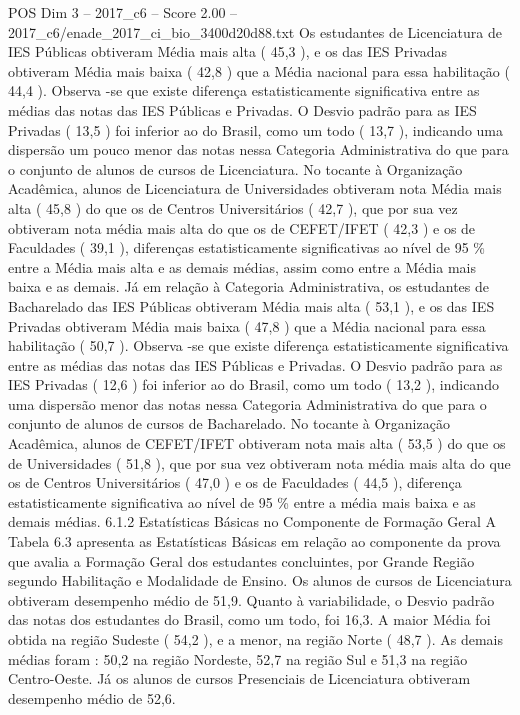 \begin{textsample}{POS Dim 3 – 2017\_c6 – Score 2.00 – 2017\_c6/enade\_2017\_ci\_bio\_3400d20d88.txt}
Os estudantes de Licenciatura de IES Públicas obtiveram Média mais alta ( 45,3 ), e os das IES Privadas obtiveram Média mais baixa ( 42,8 ) que a Média nacional para essa habilitação ( 44,4 ).
Observa -se que existe diferença estatisticamente significativa entre as médias das notas das IES Públicas e Privadas.
O Desvio padrão para as IES Privadas ( 13,5 ) foi inferior ao do Brasil, como um todo ( 13,7 ), indicando uma dispersão um pouco menor das notas nessa Categoria Administrativa do que para o conjunto de alunos de cursos de Licenciatura.
No tocante à Organização Acadêmica, alunos de Licenciatura de Universidades obtiveram nota Média mais alta ( 45,8 ) do que os de Centros Universitários ( 42,7 ), que por sua vez obtiveram nota média mais alta do que os de CEFET/IFET ( 42,3 ) e os de Faculdades ( 39,1 ), diferenças estatisticamente significativas ao nível de 95 \% entre a Média mais alta e as demais médias, assim como entre a Média mais baixa e as demais.
Já em relação à Categoria Administrativa, os estudantes de Bacharelado das IES Públicas obtiveram Média mais alta ( 53,1 ), e os das IES Privadas obtiveram Média mais baixa ( 47,8 ) que a Média nacional para essa habilitação ( 50,7 ).
Observa -se que existe diferença estatisticamente significativa entre as médias das notas das IES Públicas e Privadas.
O Desvio padrão para as IES Privadas ( 12,6 ) foi inferior ao do Brasil, como um todo ( 13,2 ), indicando uma dispersão menor das notas nessa Categoria Administrativa do que para o conjunto de alunos de cursos de Bacharelado.
No tocante à Organização Acadêmica, alunos de CEFET/IFET obtiveram nota mais alta ( 53,5 ) do que os de Universidades ( 51,8 ), que por sua vez obtiveram nota média mais alta do que os de Centros Universitários ( 47,0 ) e os de Faculdades ( 44,5 ), diferença estatisticamente significativa ao nível de 95 \% entre a média mais baixa e as demais médias. 6.1.2 Estatísticas Básicas no Componente de Formação Geral A Tabela 6.3 apresenta as Estatísticas Básicas em relação ao componente da prova que avalia a Formação Geral dos estudantes concluintes, por Grande Região segundo Habilitação e Modalidade de Ensino.
Os alunos de cursos de Licenciatura obtiveram desempenho médio de 51,9.
Quanto à variabilidade, o Desvio padrão das notas dos estudantes do Brasil, como um todo, foi 16,3.
A maior Média foi obtida na região Sudeste ( 54,2 ), e a menor, na região Norte ( 48,7 ).
As demais médias foram : 50,2 na região Nordeste, 52,7 na região Sul e 51,3 na região Centro-Oeste.
Já os alunos de cursos Presenciais de Licenciatura obtiveram desempenho médio de 52,6.

\end{textsample}
